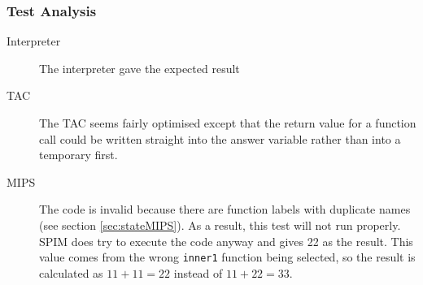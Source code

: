 \subsubsection{Test Analysis}
\begin{description}
	\item[Interpreter] The interpreter gave the expected result
	\item[TAC] The TAC seems fairly optimised except that the return value for a function call could be written straight into the answer variable rather than into a temporary first.
	\item[MIPS] The code is invalid because there are function labels with duplicate names (see section \ref{sec:stateMIPS}). As a result, this test will not run properly. SPIM does try to execute the code anyway and gives 22 as the result. This value comes from the wrong \verb!inner1! function being selected, so the result is calculated as $11 + 11 = 22$ instead of $11 + 22 = 33$.
\end{description}

